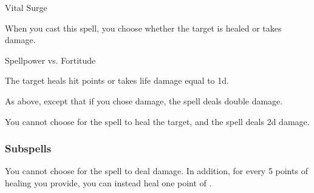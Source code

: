\newpage
\begin{spellsection}{Vital Surge}

\begin{spellcontent}

\begin{spelltargetinginfo}




\end{spelltargetinginfo}


\begin{spelleffects}
\spellspecial
When you cast this spell, you choose whether the target is healed or takes damage.




\begin{spellattack}{Spellpower vs. Fortitude}


\hit The target heals hit points or takes life damage equal to  \plus1d.


\crit As above, except that if you chose damage, the spell deals double damage.


\end{spellattack}





\end{spelleffects}

\end{spellcontent}
\begin{spellfooter}


\end{spellfooter}
\begin{spellsubcontent}


\begin{spellcantrip}
You cannot choose for the spell to heal the target, and the spell deals \minus2d damage.
\end{spellcantrip}


\end{spellsubcontent}
\end{spellsection}


\subsubsection{Subspells}



You cannot choose for the spell to deal damage.
In addition, for every 5 points of healing you provide, you can instead heal one point of .






